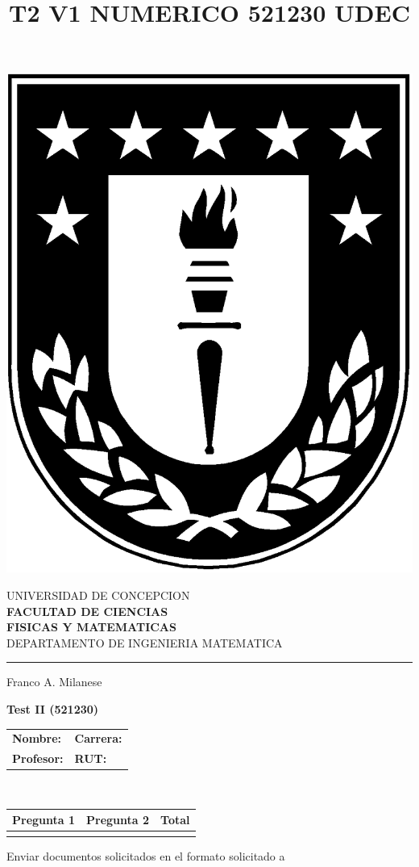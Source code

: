\documentclass[11pt]{article}
\begin{document}
\title{T2 V1 NUMERICO 521230 UDEC}

\begin{minipage}{0.12\textwidth}
\includegraphics[width=\textwidth]{logoudec.eps}
\end{minipage}
\hspace{5mm}
\begin{minipage}{0.9\textwidth}
UNIVERSIDAD DE CONCEPCION\\
{\small\small\bf 
FACULTAD DE CIENCIAS\\ 
FISICAS Y MATEMATICAS}\\
DEPARTAMENTO DE INGENIERIA MATEMATICA\\
\rule{0.66\textwidth}{.5pt} Franco A. Milanese
\end{minipage}

\vspace{0.5cm}
\centerline{\bf Test II (521230)}
\begin{center}
 \begin{tabular}{p{}p{}}
	\textbf{Nombre:}   &\textbf{Carrera:}\\
	\textbf{Profesor:} & \textbf{ RUT:}
 \end{tabular}
 \\
 \vspace{0.2cm}
 \begin{tabular}{||p{2cm}|p{2cm}||p{2cm}||}
 \hline
 Pregunta 1 &  Pregunta 2 &     Total\\
 \hline

  \vspace{1.5cm} & &       \\
 \hline
 \end{tabular}
 \end{center}
 Enviar documentos solicitados en el formato solicitado a 
\end{document}
